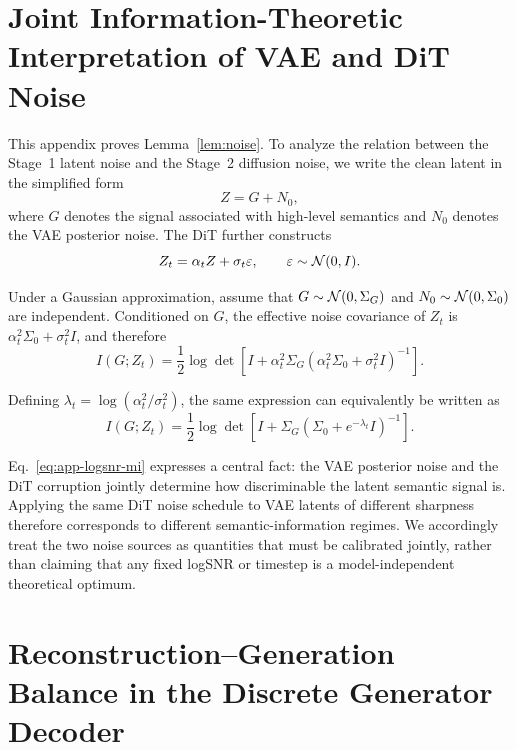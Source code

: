 \section{Joint Information-Theoretic Interpretation of VAE and DiT Noise}
\label{app:noise}

This appendix proves Lemma~\ref{lem:noise}. To analyze the relation between the Stage~1 latent noise and the Stage~2 diffusion noise, we write the clean latent in the simplified form
\begin{equation}
    Z=G+N_0,
    \label{eq:app-vae-noise}
\end{equation}
where $G$ denotes the signal associated with high-level semantics and $N_0$ denotes the VAE posterior noise. The DiT further constructs
\begin{equation}
    Z_t=\alpha_t Z+\sigma_t\varepsilon,
    \qquad
    \varepsilon\sim\mathcal{N}(0,I).
    \label{eq:app-dit-noise}
\end{equation}

Under a Gaussian approximation, assume that $G\sim\mathcal{N}(0,\Sigma_G)$ and $N_0\sim\mathcal{N}(0,\Sigma_0)$ are independent. Conditioned on $G$, the effective noise covariance of $Z_t$ is $\alpha_t^2\Sigma_0+\sigma_t^2I$, and therefore
\begin{equation}
    I(G;Z_t)
    =
    \frac12\log\det\!\left[
      I+
      \alpha_t^2\Sigma_G
      (\alpha_t^2\Sigma_0+\sigma_t^2I)^{-1}
    \right].
\label{eq:app-gaussian}
\end{equation}

Defining $\lambda_t=\log(\alpha_t^2/\sigma_t^2)$, the same expression can equivalently be written as
\begin{equation}
    I(G;Z_t)
    =
    \frac12\log\det\!\left[
      I+
      \Sigma_G(\Sigma_0+e^{-\lambda_t}I)^{-1}
    \right].
    \label{eq:app-logsnr-mi}
\end{equation}

Eq.~\eqref{eq:app-logsnr-mi} expresses a central fact: the VAE posterior noise and the DiT corruption jointly determine how discriminable the latent semantic signal is. Applying the same DiT noise schedule to VAE latents of different sharpness therefore corresponds to different semantic-information regimes. We accordingly treat the two noise sources as quantities that must be calibrated jointly, rather than claiming that any fixed logSNR or timestep is a model-independent theoretical optimum.

\section{Reconstruction--Generation Balance in the Discrete Generator Decoder}
\label{app:decoder}

